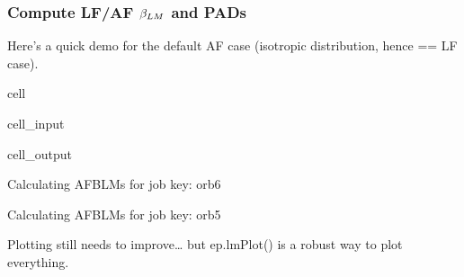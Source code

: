 \documentclass[letterpaper,10pt,english]{jupyterBook}
\begin{document}
\subsubsection{Compute LF/AF \protect\(\beta_{LM}\protect\) and PADs}
\label{\detokenize{testChpt/ePSproc_class_demo_161020:compute-lf-af-beta-lm-and-pads}}
\sphinxAtStartPar
Here’s a quick demo for the default AF case (isotropic distribution, hence == LF case).

\begin{sphinxuseclass}{cell}\begin{sphinxVerbatimInput}

\begin{sphinxuseclass}{cell_input}
\begin{sphinxVerbatim}[commandchars=\\\{\}]
\end{sphinxVerbatim}

\end{sphinxuseclass}\end{sphinxVerbatimInput}
\begin{sphinxVerbatimOutput}

\begin{sphinxuseclass}{cell_output}
\begin{sphinxVerbatim}[commandchars=\\\{\}]
Calculating AF\PYGZhy{}BLMs for job key: orb6

Calculating AF\PYGZhy{}BLMs for job key: orb5
\end{sphinxVerbatim}

\end{sphinxuseclass}\end{sphinxVerbatimOutput}

\end{sphinxuseclass}
\sphinxAtStartPar
Plotting still needs to improve… but ep.lmPlot() is a robust way to plot everything.
\end{document}
